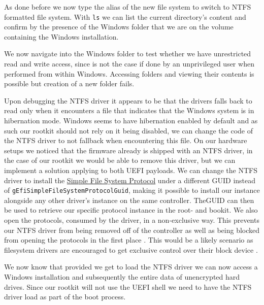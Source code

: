 As done before we now type the alias of the new file system to switch to NTFS formatted file system.
With \lstinline{ls} we can list the current directory's content and confirm by the presence of the Windows folder that we are on the volume containing the Windows installation.


We now navigate into the Windows folder to test whether we have unrestricted read and write access, since is not the case if done by an unprivileged user when performed from within Windows.
Accessing folders and viewing their contents is possible but creation of a new folder fails.

Upon debugging the \ac{NTFS} driver it appears to be that the drivers falls back to read only when it encounters a file that indicates that the Windows system is in hibernation mode.
Windows seems to have hibernation enabled by default and as such our rootkit should not rely on it being disabled, we can change the code of the \ac{NTFS} driver to not fallback when encountering this file. 
On our hardware setups we noticed that the firmware already is shipped with an \ac{NTFS} driver, in the case of our rootkit we would be able to remove this driver, but we can implement a solution applying to both \ac{UEFI} payloads. We can change the \ac{NTFS} driver to install the \hyperref[lst:simple-filesystem-protocol]{Simple File System Protocol} under a different \ac{GUID} instead of \lstinline{gEfiSimpleFileSystemProtocolGuid}, making it possible to install our instance alongside any other driver's instance on the same controller. The\ac{GUID} can then be used to retrieve our specific protocol instance in the root- and bookit. We also open the protocols, consumed by the driver, in a non-exclusive way. This prevents our \ac{NTFS} driver from being removed off of the controller as well as being blocked from opening the protocols in the first place \cite[7.3]{uefi-spec}. This would be a likely scenario as filesystem drivers are encouraged to get exclusive control over their block device \cite[13.5]{uefi-spec}.

We now know that provided we get to load the \ac{NTFS} driver we can now access a Windows installation and subsequently the entire data of unencrypted hard drives.
Since our rootkit will not use the UEFI shell we need to have the \ac{NTFS} driver load as part of the boot process.

